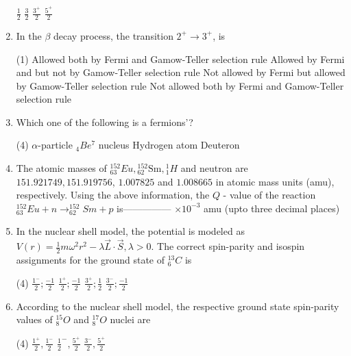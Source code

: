 \begin{enumerate}
\begin{tasks}
		\task[\textbf{A.}] $\frac{1}{2}$
		\task[\textbf{B.}] $\frac{3}{2}$
		\task[\textbf{C.}] $\frac{3^{+}}{2}$
		\task[\textbf{D.}] $\frac{5^{+}}{2}$
	\end{tasks}
	\item In the $\beta$ decay process, the transition $2^{+} \rightarrow 3^{+}$, is
	{}
	\begin{tasks}(1)
		\task[\textbf{A.}] Allowed both by Fermi and Gamow-Teller selection rule
		\task[\textbf{B.}]  Allowed by Fermi and but not by Gamow-Teller selection rule
		\task[\textbf{C.}] Not allowed by Fermi but allowed by Gamow-Teller selection rule
		\task[\textbf{D.}] Not allowed both by Fermi and Gamow-Teller selection rule
	\end{tasks}
	\item Which one of the following is a fermions'?
	{}
	\begin{tasks}(4)
		\task[\textbf{A.}] $\alpha$-particle
		\task[\textbf{B.}] ${ }_{4} B e^{7}$ nucleus
		\task[\textbf{C.}] Hydrogen atom
		\task[\textbf{D.}] Deuteron
	\end{tasks}
	\item The atomic masses of ${ }_{63}^{152} E u,{ }_{62}^{152} \mathrm{Sm},{ }_{1}^{1} H$ and neutron are $151.921749,151.919756$, $1.007825$ and $1.008665$ in atomic mass units (amu), respectively. Using the above information, the $Q$ - value of the reaction ${ }_{63}^{152} E u+n \rightarrow_{62}^{152} S m+p$ is--------------- $\times 10^{-3}$ amu (upto three decimal places)
	{}
	\item In the nuclear shell model, the potential is modeled as $V(r)=\frac{1}{2} m \omega^{2} r^{2}-\lambda \vec{L} \cdot \vec{S}, \lambda>0$. The correct spin-parity and isospin assignments for the ground state of ${ }_{6}^{13} C$ is
	{}
	\begin{tasks}(4)
		\task[\textbf{A.}] $\frac{1^{-}}{2} ; \frac{-1}{2}$
		\task[\textbf{B.}] $\frac{1^{+}}{2} ; \frac{-1}{2}$
		\task[\textbf{C.}] $\frac{3^{+}}{2} ; \frac{1}{2}$
		\task[\textbf{D.}] $\frac{3^{-}}{2} ; \frac{-1}{2}$
	\end{tasks}
	\item According to the nuclear shell model, the respective ground state spin-parity values of ${ }_{8}^{15} O$ and ${ }_{8}^{17} O$ nuclei are
	{}
	\begin{tasks}(4)
		\task[\textbf{A.}] $\frac{1^{+}}{2}, \frac{1^{-}}{2}$
		\task[\textbf{B.}] $\frac{1}{2}^{-}, \frac{5^{+}}{2}$
		\task[\textbf{C.}] $\frac{3^{-}}{2}, \frac{5^{+}}{2}$

\end{tasks}
\end{enumerate}
